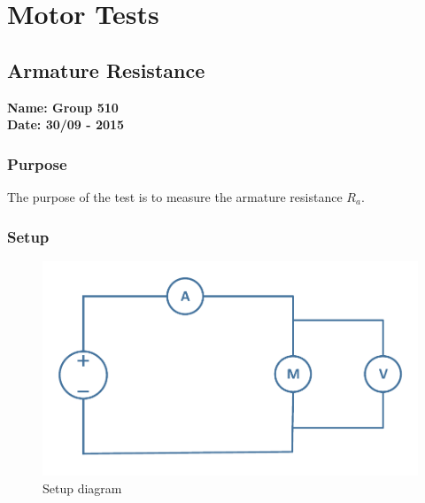 \pagebreak
\section{Motor Tests}
\nopagebreak
\subsection{Armature Resistance} %
\textbf{Name: Group 510}\\
\textbf{Date: 30/09 - 2015}

\subsubsection{Purpose}
The purpose of the test is to measure the armature resistance $R_a$.

\subsubsection{Setup}
\begin{figure}[H]
  \centering
	\includegraphics[scale=0.5]{figures/MotorTest1.pdf}
	\caption{Setup diagram}
\end{figure}

